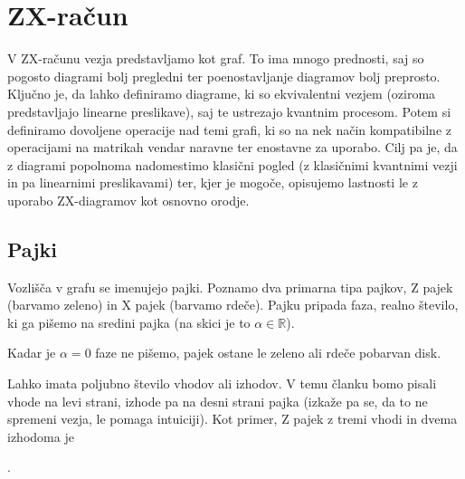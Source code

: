\documentclass[mat1]{fmfdelo}
\newcommand{\R}{\mathbb R}
\begin{document}

\section{ZX-račun}
V ZX-računu vezja predstavljamo kot graf. To ima mnogo prednosti, saj so pogosto diagrami bolj pregledni ter poenostavljanje diagramov bolj preprosto. Ključno je, da lahko definiramo diagrame, ki so ekvivalentni vezjem (oziroma predstavljajo linearne preslikave), saj te ustrezajo kvantnim procesom. Potem si definiramo dovoljene operacije nad temi grafi, ki so na nek način kompatibilne z operacijami na matrikah vendar naravne ter enostavne za uporabo. Cilj pa je, da z diagrami popolnoma nadomestimo klasični pogled (z klasičnimi kvantnimi vezji in pa linearnimi preslikavami) ter, kjer je mogoče, opisujemo lastnosti le z uporabo ZX-diagramov kot osnovno orodje.
\subsection{Pajki}
Vozlišča v grafu se imenujejo pajki. Poznamo dva primarna tipa pajkov, Z pajek (barvamo zeleno) in X pajek (barvamo rdeče). Pajku pripada faza, realno število, ki ga pišemo na sredini pajka (na skici je to \(\alpha\in\R\)).
\begin{center}
\end{center}
Kadar je \(\alpha = 0\) faze ne pišemo, pajek ostane le zeleno ali rdeče pobarvan disk.

Lahko imata poljubno število vhodov ali izhodov. V temu članku bomo pisali vhode na levi strani, izhode pa na desni strani pajka (izkaže pa se, da to ne spremeni vezja, le pomaga intuiciji). Kot primer, Z pajek z tremi vhodi in dvema izhodoma je

\begin{center}
  .
\end{center}
\end{document}
